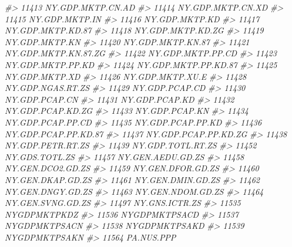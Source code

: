 \documentclass[
]{bxjsbook}
\newenvironment{Shaded}{\begin{snugshade}}{\end{snugshade}}
\newcommand{\CommentTok}[1]{\textcolor[rgb]{0.56,0.35,0.01}{\textit{#1}}}
\theoremstyle{definition}
\theoremstyle{definition}
\theoremstyle{definition}
\theoremstyle{definition}
\theoremstyle{remark}
\begin{document}
\begin{Shaded}
\begin{Highlighting}[]
\CommentTok{\#\textgreater{} 11413          NY.GDP.MKTP.CN.AD}
\CommentTok{\#\textgreater{} 11414          NY.GDP.MKTP.CN.XD}
\CommentTok{\#\textgreater{} 11415             NY.GDP.MKTP.IN}
\CommentTok{\#\textgreater{} 11416             NY.GDP.MKTP.KD}
\CommentTok{\#\textgreater{} 11417          NY.GDP.MKTP.KD.87}
\CommentTok{\#\textgreater{} 11418          NY.GDP.MKTP.KD.ZG}
\CommentTok{\#\textgreater{} 11419             NY.GDP.MKTP.KN}
\CommentTok{\#\textgreater{} 11420          NY.GDP.MKTP.KN.87}
\CommentTok{\#\textgreater{} 11421       NY.GDP.MKTP.KN.87.ZG}
\CommentTok{\#\textgreater{} 11422          NY.GDP.MKTP.PP.CD}
\CommentTok{\#\textgreater{} 11423          NY.GDP.MKTP.PP.KD}
\CommentTok{\#\textgreater{} 11424       NY.GDP.MKTP.PP.KD.87}
\CommentTok{\#\textgreater{} 11425             NY.GDP.MKTP.XD}
\CommentTok{\#\textgreater{} 11426           NY.GDP.MKTP.XU.E}
\CommentTok{\#\textgreater{} 11428          NY.GDP.NGAS.RT.ZS}
\CommentTok{\#\textgreater{} 11429             NY.GDP.PCAP.CD}
\CommentTok{\#\textgreater{} 11430             NY.GDP.PCAP.CN}
\CommentTok{\#\textgreater{} 11431             NY.GDP.PCAP.KD}
\CommentTok{\#\textgreater{} 11432          NY.GDP.PCAP.KD.ZG}
\CommentTok{\#\textgreater{} 11433             NY.GDP.PCAP.KN}
\CommentTok{\#\textgreater{} 11434          NY.GDP.PCAP.PP.CD}
\CommentTok{\#\textgreater{} 11435          NY.GDP.PCAP.PP.KD}
\CommentTok{\#\textgreater{} 11436       NY.GDP.PCAP.PP.KD.87}
\CommentTok{\#\textgreater{} 11437       NY.GDP.PCAP.PP.KD.ZG}
\CommentTok{\#\textgreater{} 11438          NY.GDP.PETR.RT.ZS}
\CommentTok{\#\textgreater{} 11439          NY.GDP.TOTL.RT.ZS}
\CommentTok{\#\textgreater{} 11452             NY.GDS.TOTL.ZS}
\CommentTok{\#\textgreater{} 11457          NY.GEN.AEDU.GD.ZS}
\CommentTok{\#\textgreater{} 11458          NY.GEN.DCO2.GD.ZS}
\CommentTok{\#\textgreater{} 11459          NY.GEN.DFOR.GD.ZS}
\CommentTok{\#\textgreater{} 11460          NY.GEN.DKAP.GD.ZS}
\CommentTok{\#\textgreater{} 11461          NY.GEN.DMIN.GD.ZS}
\CommentTok{\#\textgreater{} 11462          NY.GEN.DNGY.GD.ZS}
\CommentTok{\#\textgreater{} 11463          NY.GEN.NDOM.GD.ZS}
\CommentTok{\#\textgreater{} 11464          NY.GEN.SVNG.GD.ZS}
\CommentTok{\#\textgreater{} 11497             NY.GNS.ICTR.ZS}
\CommentTok{\#\textgreater{} 11535               NYGDPMKTPKDZ}
\CommentTok{\#\textgreater{} 11536              NYGDPMKTPSACD}
\CommentTok{\#\textgreater{} 11537              NYGDPMKTPSACN}
\CommentTok{\#\textgreater{} 11538              NYGDPMKTPSAKD}
\CommentTok{\#\textgreater{} 11539              NYGDPMKTPSAKN}
\CommentTok{\#\textgreater{} 11564                 PA.NUS.PPP}

\end{Highlighting}
\end{Shaded}
\end{document}
